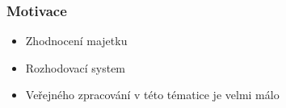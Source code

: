 




\begin{frame}
    \frametitle{Motivace}
    \begin{itemize}
        \itemsep1em
        \item Zhodnocení majetku
        \item Rozhodovací system
        \item Veřejného zpracování v této tématice je velmi málo
    \end{itemize}
\end{frame}

